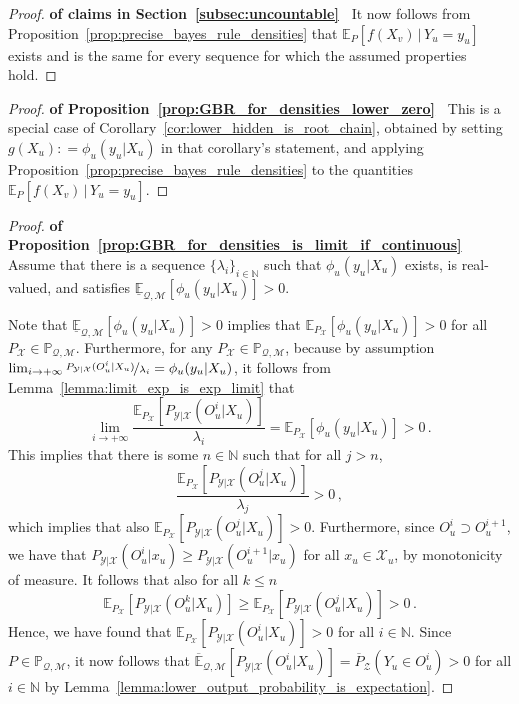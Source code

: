 \documentclass[twoside,11pt]{article}
\newcommand{\nats}{\mathbb{N}}
\newcommand{\states}{\mathcal{X}}
\newcommand{\observs}{\mathcal{Y}}
\newcommand{\lexp}{\underline{\mathbb{E}}_{\rateset,\mathcal{M}}}
\newcommand{\uexp}{\overline{\mathbb{E}}_{\rateset,\mathcal{M}}}
\newcommand{\rateset}{\mathcal{Q}}
\newcommand{\coloneqq}{:\!=}
\begin{document}
\begin{proof}{\bf of claims in Section~\ref{subsec:uncountable}~}
It now follows from Proposition~\ref{prop:precise_bayes_rule_densities} that $\mathbb{E}_P[f(X_v)\,\vert\,Y_u=y_u]$ exists and is the same for every sequence for which the assumed properties hold.
\end{proof}

\begin{proof}{\bf of Proposition~\ref{prop:GBR_for_densities_lower_zero}~}
This is a special case of Corollary~\ref{cor:lower_hidden_is_root_chain}, obtained by setting $g(X_u)\coloneqq \phi_u(y_u\vert X_u)$ in that corollary's statement, and applying Proposition~\ref{prop:precise_bayes_rule_densities} to the quantities $\mathbb{E}_P[f(X_v)\,\vert\,Y_u=y_u]$.
\end{proof}


\begin{proof}{\bf of Proposition~\ref{prop:GBR_for_densities_is_limit_if_continuous}~}
Assume that there is a sequence $\{\lambda_i\}_{i\in\nats}$ such that $\phi_u(y_u\vert X_u)$ exists, is real-valued, and satisfies $\lexp[\phi_u(y_u\vert X_u)] >0$. 

Note that $\lexp[\phi_u(y_u\vert X_u)] >0$ implies that $\mathbb{E}_{P_\states}[\phi_u(y_u\vert X_u)]>0$ for all $P_\states\in\mathbb{P}_{\rateset,\mathcal{M}}$. Furthermore, for any $P_\states\in\mathbb{P}_{\rateset,\mathcal{M}}$, because by assumption $\lim_{i\to+\infty}\nicefrac{P_{\observs\vert\states}(O_u^i\vert X_u)}{\lambda_i}=\phi_u(y_u\vert X_u)$, it follows from Lemma~\ref{lemma:limit_exp_is_exp_limit} that
\begin{equation*}
\lim_{i\to+\infty}\frac{\mathbb{E}_{P_\states}[P_{\observs\vert\states}(O_u^i\vert X_u)]}{\lambda_i} = \mathbb{E}_{P_\states}[\phi_u(y_u\vert X_u)] > 0\,.
\end{equation*}
This implies that there is some $n\in\nats$ such that for all $j>n$,
\begin{equation*}
\frac{\mathbb{E}_{P_\states}[P_{\observs\vert\states}(O_u^j\vert X_u)]}{\lambda_j} > 0\,,
\end{equation*}
which implies that also $\mathbb{E}_{P_\states}[P_{\observs\vert\states}(O_u^j\vert X_u)] >0$. Furthermore, since $O_u^i\supset O_u^{i+1}$, we have that $P_{\observs\vert\states}(O_u^i\vert x_u)\geq P_{\observs\vert\states}(O_u^{i+1}\vert x_u)$ for all $x_u\in\states_u$, by monotonicity of measure. It follows that also for all $k\leq n$
\begin{equation*}
\mathbb{E}_{P_\states}[P_{\observs\vert\states}(O_u^k\vert X_u)] \geq \mathbb{E}_{P_\states}[P_{\observs\vert\states}(O_u^j\vert X_u)] > 0\,.
\end{equation*}
Hence, we have found that $\mathbb{E}_{P_\states}[P_{\observs\vert\states}(O_u^i\vert X_u)]>0$ for all $i\in\nats$. Since $P\in\mathbb{P}_{\rateset,\mathcal{M}}$, it now follows that $\uexp[P_{\observs\vert\states}(O_u^i\vert X_u)]=\overline{P}_{\mathcal{Z}}(Y_u\in O_u^i)>0$ for all $i\in\nats$ by Lemma~\ref{lemma:lower_output_probability_is_expectation}.


\end{proof}
\end{document}

